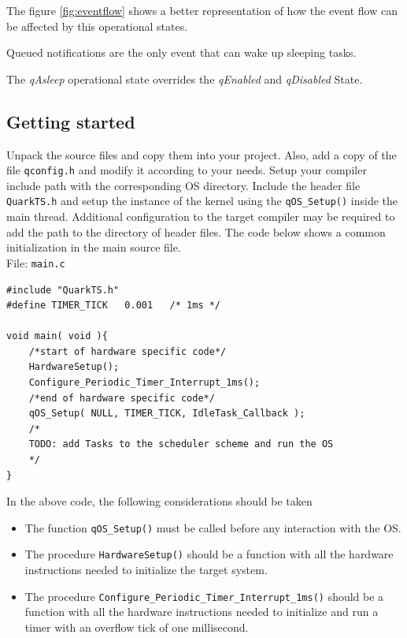 \documentclass{article}
\begin{document}
The figure \ref{fig:eventflow} shows a better representation of how the event flow can be affected by this operational states.

\begin{tcolorbox}
\HandRight Queued notifications are the only event that can wake up sleeping tasks.
\end{tcolorbox}
\begin{tcolorbox}
\HandRight The \textit{qAsleep} operational state overrides the \textit{qEnabled} and \textit{qDisabled} State.
\end{tcolorbox}




\subsection{Getting started}
Unpack the source files and copy them into your project. Also, add a copy of the file \lstinline{qconfig.h} and modify it according to your needs. Setup your compiler include path with the corresponding OS directory. Include the header file \lstinline{QuarkTS.h} and setup the instance of the kernel using the \lstinline{qOS_Setup()} inside the main thread. Additional configuration to the target compiler may be required to add the path to the directory of header files. The code below shows a common initialization in the main source file. \\

File: \lstinline{main.c}
\begin{lstlisting}[style=CStyle]
#include "QuarkTS.h"
#define TIMER_TICK   0.001   /* 1ms */ 

void main( void ){
    /*start of hardware specific code*/
    HardwareSetup();  
    Configure_Periodic_Timer_Interrupt_1ms(); 
    /*end of hardware specific code*/
    qOS_Setup( NULL, TIMER_TICK, IdleTask_Callback ); 
    /*
    TODO: add Tasks to the scheduler scheme and run the OS
    */
}
\end{lstlisting}

In the above code, the following considerations should be taken
\begin{itemize}
    \item The function \lstinline{qOS_Setup()} must be called before any interaction with the OS.
    \item The procedure \lstinline{HardwareSetup()} should be a function with all the hardware instructions needed to initialize the target system.
    \item  The procedure \lstinline{Configure_Periodic_Timer_Interrupt_1ms()} should be a function with all the hardware instructions needed to initialize and run a timer with an overflow tick of one millisecond.
\end{itemize}
\end{document}
